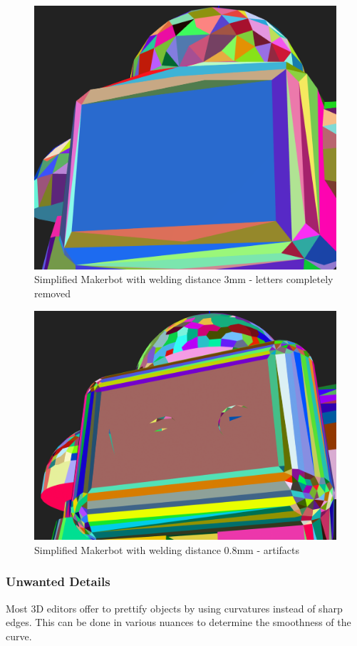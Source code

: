 \documentclass[../ClassicThesis.tex]{subfiles}
\begin{document}
\begin{figure}
\includegraphics[width=0.8\columnwidth]{Images/04-approx-welding-make-3mm.png}
\caption{Simplified Makerbot with welding distance 3mm - letters completely removed}
\label{fig:3mmMakerbotMake}
\end{figure}

\begin{figure}
\includegraphics[width=0.8\columnwidth]{Images/04-approx-welding-make-0_8mm.png}
\caption{Simplified Makerbot with welding distance 0.8mm - artifacts}
\label{fig:08mmMakerbotMake}
\end{figure}

\subsubsection{Unwanted Details}

Most 3D editors offer to prettify objects by using curvatures instead of sharp edges. This can be done in various nuances to determine the smoothness of the curve.
\end{document}
